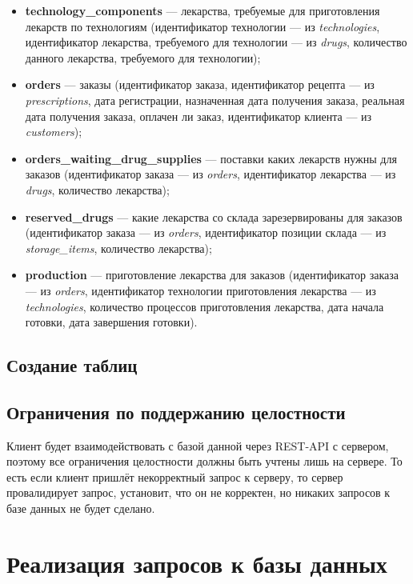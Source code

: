 \documentclass[a4paper]{article}
\newcommand{\dbtable}[1]{\textbf{#1}}
\newcommand{\dbtableref}[1]{\textit{#1}}
\begin{document}
\begin{itemize}
				\item \dbtable{technology\_components} --- лекарства, требуемые для приготовления лекарств по технологиям (идентификатор технологии --- из \dbtableref{technologies}, идентификатор лекарства, требуемого для технологии --- из \dbtableref{drugs}, количество данного лекарства, требуемого для технологии);
					
				\item \dbtable{orders} --- заказы (идентификатор заказа, идентификатор рецепта --- из \dbtableref{prescriptions}, дата регистрации, назначенная дата получения заказа, реальная дата получения заказа, оплачен ли заказ, идентификатор клиента --- из \dbtableref{customers});
					
				\item \dbtable{orders\_waiting\_drug\_supplies} --- поставки каких лекарств нужны для заказов (идентификатор заказа --- из \dbtableref{orders}, идентификатор лекарства --- из \dbtableref{drugs}, количество лекарства);
					
				\item \dbtable{reserved\_drugs} --- какие лекарства со склада зарезервированы для заказов (идентификатор заказа --- из \dbtableref{orders}, идентификатор позиции склада --- из \dbtableref{storage\_items}, количество лекарства);
					
				\item \dbtable{production} --- приготовление лекарства для заказов (идентификатор заказа --- из \dbtableref{orders}, идентификатор технологии приготовления лекарства --- из \dbtableref{technologies}, количество процессов приготовления лекарства, дата начала готовки, дата завершения готовки).
			\end{itemize}	
		\subsection{Создание таблиц}
			
		\subsection{Ограничения по поддержанию целостности}
			Клиент будет взаимодействовать с базой данной через REST-API с сервером, поэтому все ограничения целостности должны быть учтены лишь на сервере. То есть если клиент пришлёт некорректный запрос к серверу, то сервер провалидирует запрос, установит, что он не корректен, но никаких запросов к базе данных не будет сделано.
	\newpage
	\section{Реализация запросов к базы данных}
\end{document}

